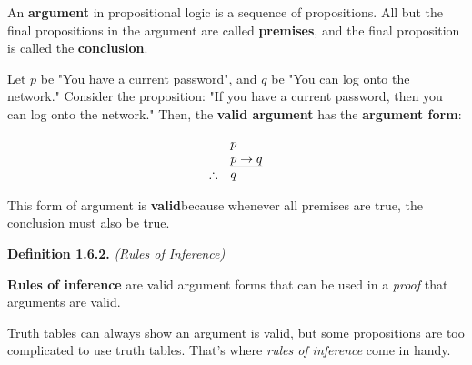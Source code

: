 \documentclass[12pt, letterpaper]{article}
\begin{document}
An \textbf{argument} in propositional logic is a sequence of propositions. All but the final propositions in the argument are called \textbf{premises}, and the final proposition is called the \textbf{conclusion}.
\medskip

Let $ p $ be "You have a current password", and $ q $ be "You can log onto the network." Consider the proposition: "If you have a current password, then you can log onto the network." Then, the \textbf{valid argument} has the \textbf{argument form}:

\medskip
\[\centering
    \begin{array}{l l}
        & p \\
        & \underline{p \rightarrow q} \\
        \therefore & q
    \end{array}
\]
\medskip

This form of argument is \textbf{valid}because whenever all premises are true, the conclusion must also be true.

\bigskip
\bigskip

\textbf{Definition 1.6.2.} \textit{(Rules of Inference)}
\medskip

\textbf{Rules of inference} are valid argument forms that can be used in a \textit{proof} that arguments are valid.
\medskip

Truth tables can always show an argument is valid, but some propositions are too complicated to use truth tables. That's where \textit{rules of inference} come in handy.
\medskip
\end{document}

